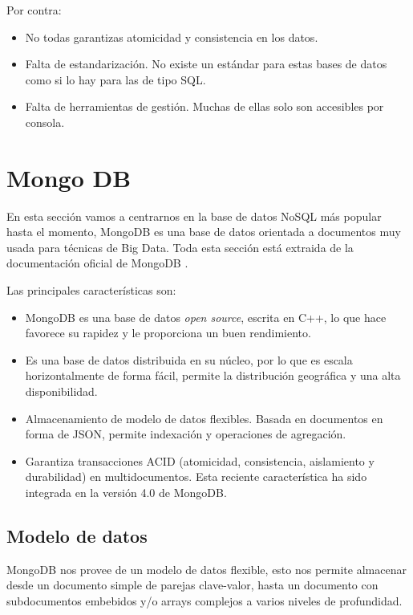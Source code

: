 Por contra:

\begin{itemize}
    \item No todas garantizas atomicidad y consistencia en los datos.
    \item Falta de estandarización. No existe un estándar para estas bases de datos como si lo hay para las de tipo SQL.
    \item Falta de herramientas de gestión. Muchas de ellas solo son accesibles por consola.
\end{itemize}

\section{Mongo DB}

En esta sección vamos a centrarnos en la base de datos NoSQL más popular hasta el momento, MongoDB es una base de datos orientada a documentos muy usada para técnicas de Big Data. Toda esta sección está extraida de la documentación oficial de MongoDB \cite{mongodb}.

Las principales características son:

\begin{itemize}
    \item MongoDB es una base de datos \textit{open source}, escrita en C++, lo que hace favorece su rapidez y le proporciona un buen rendimiento.
    \item Es una base de datos distribuida en su núcleo, por lo que es escala horizontalmente de forma fácil, permite la distribución geográfica y una alta disponibilidad.
    \item Almacenamiento de modelo de datos flexibles. Basada en documentos en forma de JSON, permite indexación y operaciones de agregación.
    \item Garantiza transacciones ACID (atomicidad, consistencia, aislamiento y durabilidad) en multidocumentos. Esta reciente característica ha sido integrada en la versión 4.0 de MongoDB.
\end{itemize}

\subsection{Modelo de datos}

MongoDB nos provee de un modelo de datos flexible, esto nos permite almacenar desde un documento simple de parejas clave-valor, hasta un documento con subdocumentos embebidos y/o arrays complejos a varios niveles de profundidad.

